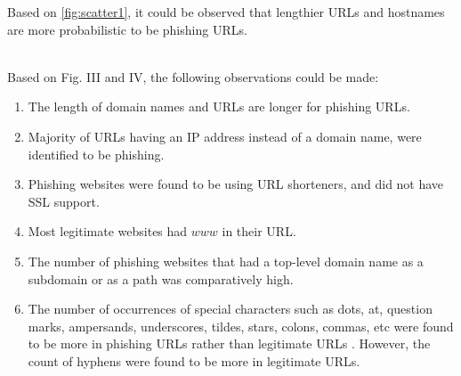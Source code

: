 Based on \ref{fig:scatter1}, it could be observed that lengthier URLs and hostnames are more probabilistic  to be phishing URLs. 

\\Based on Fig. III and IV, the following observations could be made:

\begin{enumerate}

\item The length of domain names and URLs are longer for phishing URLs.
\item Majority of URLs having an IP address instead of a domain name, were identified to be phishing. 
\item Phishing websites were found to be  using URL shorteners, and did not have SSL support.
\item Most legitimate websites had $www$ in their URL.
\item The number  of phishing websites that had a top-level domain name as a subdomain or as a path was comparatively high.
\item The number of occurrences of special characters such as dots, at, question marks, ampersands, underscores, tildes, stars, colons, commas, etc were found to be more in phishing URLs rather than legitimate URLs . However, the count of hyphens were found to be more in legitimate URLs.

\end{enumerate}